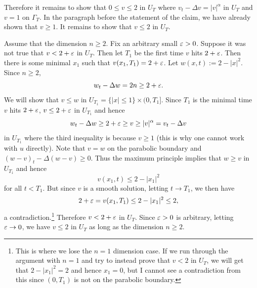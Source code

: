 Therefore it remains to show that $0 \leq v \leq 2$ in $U_{T}$ where $v_{t} - \Delta v = |v|^{\alpha}$ in $U_{T}$
and $v = 1$ on $\Gamma_{T}$. In the paragraph before the statement of the claim, we have already shown that $v \geq 1$.
It remains to show that $v \leq 2$ in $U_{T}$.


Assume that the dimension $n \geq 2$. Fix an arbitrary small $\varepsilon > 0$.
Suppose it was not true that $v < 2 + \varepsilon$ in $U_{T}$.
Then let $T_{1}$ be the first time $v$ hits $2 + \varepsilon$. Then there is some minimal $x_{1}$ such that $v(x_{1}, T_{1}) = 2 + \varepsilon$.
Let $w(x, t) := 2 - |x|^{2}$. Since $n \geq 2$,
$$w_{t} - \Delta w = 2n \geq 2 + \varepsilon.$$
We will show that $v \leq w$ in $U_{T_{1}} = \{|x| \leq 1\} \times (0, T_{1}]$. Since $T_{1}$ is the minimal time $v$ hits $2 + \varepsilon$, $v \leq 2 + \varepsilon$ in $U_{T_1}$ and hence
$$w_{t} - \Delta w \geq 2 + \varepsilon \geq v \geq |v|^{\alpha} = v_{t} - \Delta v$$
in $U_{T_{1}}$
where the third inequality is because $v \geq 1$ (this is why one cannot work with $u$ directly).
Note that $v = w$ on the parabolic boundary and $(w - v)_{t} - \Delta(w - v) \geq 0$. Thus the maximum principle implies
that $w \geq v$ in $U_{T_1}$ and hence
$$v(x_{1}, t) \leq 2 - |x_{1}|^{2}$$
for all $t < T_{1}$. But since $v$ is a smooth solution, letting $t \rightarrow T_{1}$, we then have
$$2 + \varepsilon = v(x_{1}, T_{1}) \leq 2 - |x_{1}|^{2} \leq 2,$$ a contradiction.\footnote{This is where we lose the $n = 1$ dimension case. If we run through the argument with $n = 1$ and try to
instead prove that $v < 2$ in $U_{T}$, we will get that
 $2 - |x_{1}|^{2} = 2$ and hence $x_{1} = 0$, but I cannot see a contradiction from this since $(0, T_{1})$ is not on the parabolic boundary.} Therefore $v < 2 + \varepsilon$ in $U_{T}$.
Since $\varepsilon > 0$ is arbitrary, letting $\varepsilon \rightarrow 0$, we have $v \leq 2$ in $U_{T}$ as long as the dimension $n \geq 2$.

